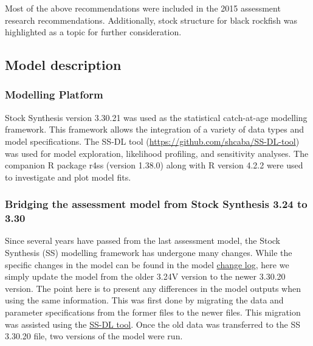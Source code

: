 \documentclass[11pt,
  english,
  letterpaper,
]{article}
\begin{document}
Most of the above recommendations were included in the 2015 assessment research recommendations. Additionally, stock structure for black rockfish was highlighted as a topic for further consideration.

\hypertarget{model-description}{%
\subsection{Model description}\label{model-description}}

\hypertarget{modelling-platform}{%
\subsubsection{Modelling Platform}\label{modelling-platform}}

Stock Synthesis version 3.30.21 was used as the statistical catch-at-age modelling framework. This framework allows the integration of a variety of data types and model specifications. The SS-DL tool (\url{https://github.com/shcaba/SS-DL-tool}) was used for model exploration, likelihood profiling, and sensitivity analyses. The companion R package r4ss (version 1.38.0) along with R version 4.2.2 were used to investigate and plot model fits.

\hypertarget{bridging-the-assessment-model-from-stock-synthesis-3.24-to-3.30}{%
\subsubsection{Bridging the assessment model from Stock Synthesis 3.24 to 3.30}\label{bridging-the-assessment-model-from-stock-synthesis-3.24-to-3.30}}

Since several years have passed from the last assessment model, the Stock Synthesis (SS) modelling framework has undergone many changes. While the specific changes in the model can be found in the model \href{https://github.com/nmfs-stock-synthesis/stock-synthesis/blob/v3.30.19/Change_log_for_SS_3.30.xlsx?raw=true}{change log}, here we simply update the model from the older 3.24V version to the newer 3.30.20 version. The point here is to present any differences in the model outputs when using the same information. This was first done by migrating the data and parameter specifications from the former files to the newer files. This migration was assisted using the \href{https://github.com/shcaba/SS-DL-tool}{SS-DL tool}. Once the old data was transferred to the SS 3.30.20 file, two versions of the model were run.
\end{document}

